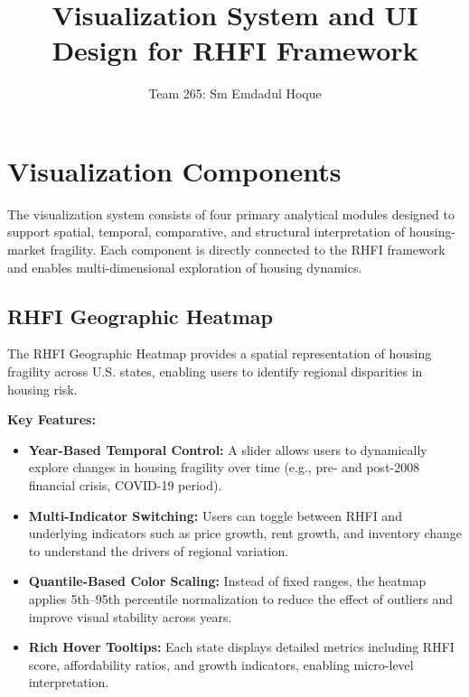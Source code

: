 \documentclass[11pt,twocolumn]{article}
\title{\vspace{-1.2em}\textbf{Visualization System and UI Design for RHFI Framework}\vspace{-0.8em}}
\author{Team 265: Sm Emdadul Hoque}
\date{}
\begin{document}
    \twocolumn[
        \maketitle
        \vspace{-1.5em}
    ]

    \section{Visualization Components}

    The visualization system consists of four primary analytical modules designed to support spatial, temporal, comparative, and structural interpretation of housing-market fragility. Each component is directly connected to the RHFI framework and enables multi-dimensional exploration of housing dynamics.

    \subsection{RHFI Geographic Heatmap}

    The RHFI Geographic Heatmap provides a spatial representation of housing fragility across U.S. states, enabling users to identify regional disparities in housing risk.



    \textbf{Key Features:}
    \begin{itemize}[leftmargin=1.2em]
        \item \textbf{Year-Based Temporal Control:} A slider allows users to dynamically explore changes in housing fragility over time (e.g., pre- and post-2008 financial crisis, COVID-19 period).

        \item \textbf{Multi-Indicator Switching:} Users can toggle between RHFI and underlying indicators such as price growth, rent growth, and inventory change to understand the drivers of regional variation.

        \item \textbf{Quantile-Based Color Scaling:} Instead of fixed ranges, the heatmap applies 5th–95th percentile normalization to reduce the effect of outliers and improve visual stability across years.

        \item \textbf{Rich Hover Tooltips:} Each state displays detailed metrics including RHFI score, affordability ratios, and growth indicators, enabling micro-level interpretation.
    \end{itemize}
\end{document}
